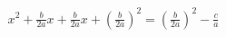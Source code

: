 \documentclass[preview]{standalone}
\begin{document}
\begin{align*}
{x}^{2} + \frac{b}{2 a} x + \frac{b}{2 a} x + {\left( \frac{b}{2 a} \right)}^{2} = {\left( \frac{b}{2 a} \right)}^{2} - \frac{c}{a}
\end{align*}
\end{document}
